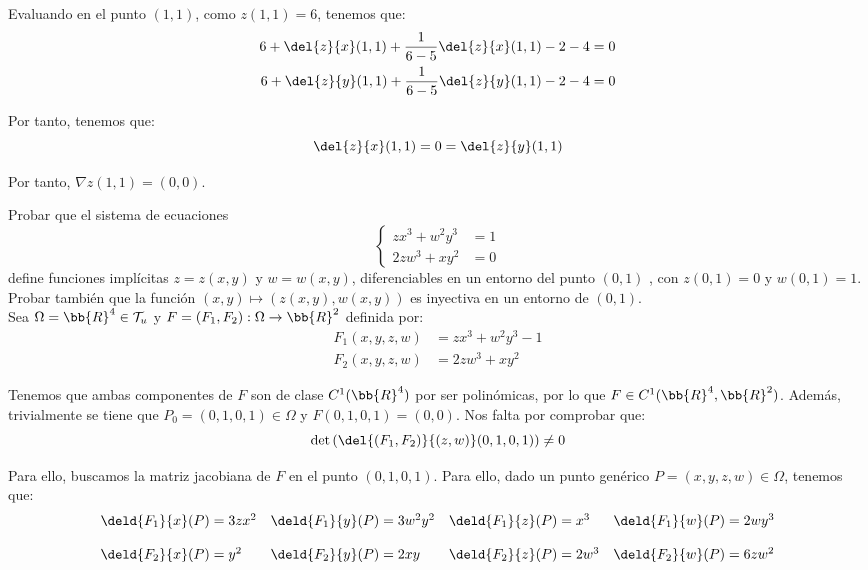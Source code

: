 \begin{ejercicio}
    Evaluando en el punto $(1,1)$, como $z(1,1)=6$, tenemos que:
    \begin{align*}
        6 + \del{z}{x}(1,1) + \frac{1}{6-5}\del{z}{x}(1,1) - 2 - 4 &= 0 \\
        6 + \del{z}{y}(1,1) + \frac{1}{6-5}\del{z}{y}(1,1) - 2 - 4 &= 0
    \end{align*}

    Por tanto, tenemos que:
    \begin{equation*}
        \del{z}{x}(1,1) = 0 = \del{z}{y}(1,1)
    \end{equation*}

    Por tanto, $\nabla z(1,1) = (0,0)$.
\end{ejercicio}


\begin{ejercicio}
    Probar que el sistema de ecuaciones
    \begin{equation*}
        \left\{
            \begin{array}{ll}
                zx^3 + w^2y^3 &= 1 \\
                2zw^3 + xy^2 &= 0
            \end{array}
        \right.
    \end{equation*}
    define funciones implícitas $z = z(x, y)$ y $w = w(x, y)$, diferenciables en un entorno
    del punto $(0,1)$ , con $z(0,1)=0$ y $w(0,1) = 1$. Probar también que
    la función $(x,y) \mapsto (z(x,y), w(x,y))$ es inyectiva en un entorno de $(0,1)$.\\

    Sea $\Omega = \bb{R}^4\in \mathcal{T}_u$ y $F=(F_1,F_2):\Omega \to \bb{R}^2$ definida por:
    \begin{align*}
        F_1(x,y,z,w) &= zx^3 + w^2y^3 - 1 \\
        F_2(x,y,z,w) &= 2zw^3 + xy^2
    \end{align*}

    Tenemos que ambas componentes de $F$ son de clase $C^1(\bb{R}^4)$ por ser polinómicas,
    por lo que $F\in C^1(\bb{R}^4,\bb{R}^2)$. Además, trivialmente se tiene que $P_0=(0,1,0,1)\in \Omega$ y $F(0,1,0,1)=(0,0)$.
    Nos falta por comprobar que:
    \begin{equation*}
        \det \left( \del{(F_1,F_2)}{(z,w)}(0,1,0,1) \right) \neq 0
    \end{equation*}

    Para ello, buscamos la matriz jacobiana de $F$ en el punto $(0,1,0,1)$. Para ello, dado un punto genérico $P=(x,y,z,w)\in \Omega$, tenemos que:
    \begin{equation*}
        \begin{array}{llll}
            \deld{F_1}{x}(P) = 3zx^2 & \deld{F_1}{y}(P) = 3w^2y^2 & \deld{F_1}{z}(P) = x^3 & \deld{F_1}{w}(P) = 2wy^3 \\ \\
            \deld{F_2}{x}(P) = y^2 & \deld{F_2}{y}(P) = 2xy & \deld{F_2}{z}(P) = 2w^3 & \deld{F_2}{w}(P) = 6zw^2
        \end{array}
    \end{equation*}


\end{ejercicio}
